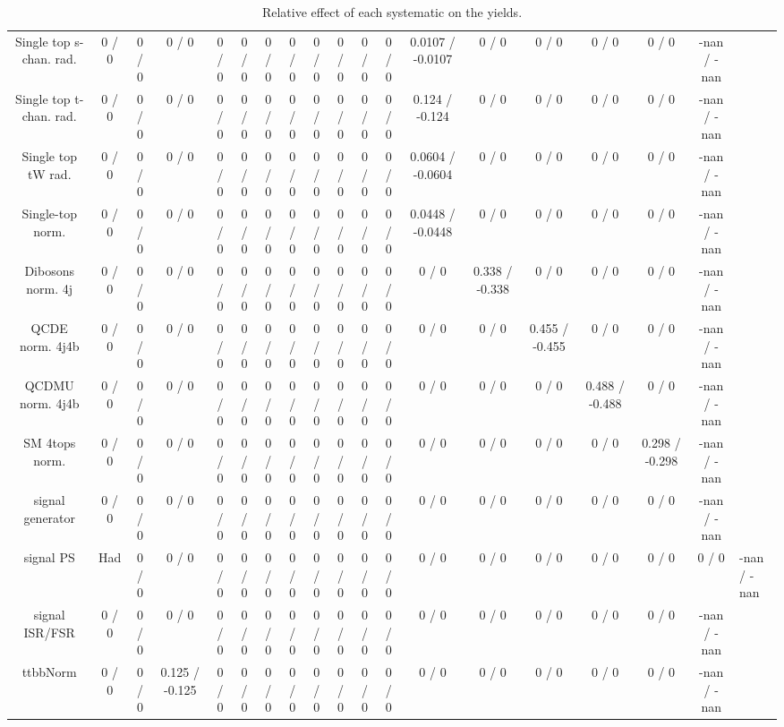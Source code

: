 \documentclass[10pt]{article}
\begin{document}
\begin{table}[htbp]
\begin{center}
\begin{tabular}{|c|c|c|c|c|c|c|c|c|c|c|c|c|c|c|c|c|c|}
  Single top s-chan. rad. & 0 / 0 & 0 / 0 & 0 / 0 & 0 / 0 & 0 / 0 & 0 / 0 & 0 / 0 & 0 / 0 & 0 / 0 & 0 / 0 & 0 / 0 & 0.0107 / -0.0107 & 0 / 0 & 0 / 0 & 0 / 0 & 0 / 0 & -nan / -nan \\ 
  Single top t-chan. rad. & 0 / 0 & 0 / 0 & 0 / 0 & 0 / 0 & 0 / 0 & 0 / 0 & 0 / 0 & 0 / 0 & 0 / 0 & 0 / 0 & 0 / 0 & 0.124 / -0.124 & 0 / 0 & 0 / 0 & 0 / 0 & 0 / 0 & -nan / -nan \\ 
  Single top tW rad. & 0 / 0 & 0 / 0 & 0 / 0 & 0 / 0 & 0 / 0 & 0 / 0 & 0 / 0 & 0 / 0 & 0 / 0 & 0 / 0 & 0 / 0 & 0.0604 / -0.0604 & 0 / 0 & 0 / 0 & 0 / 0 & 0 / 0 & -nan / -nan \\ 
  Single-top norm. & 0 / 0 & 0 / 0 & 0 / 0 & 0 / 0 & 0 / 0 & 0 / 0 & 0 / 0 & 0 / 0 & 0 / 0 & 0 / 0 & 0 / 0 & 0.0448 / -0.0448 & 0 / 0 & 0 / 0 & 0 / 0 & 0 / 0 & -nan / -nan \\ 
  Dibosons norm. 4j & 0 / 0 & 0 / 0 & 0 / 0 & 0 / 0 & 0 / 0 & 0 / 0 & 0 / 0 & 0 / 0 & 0 / 0 & 0 / 0 & 0 / 0 & 0 / 0 & 0.338 / -0.338 & 0 / 0 & 0 / 0 & 0 / 0 & -nan / -nan \\ 
  QCDE norm. 4j4b & 0 / 0 & 0 / 0 & 0 / 0 & 0 / 0 & 0 / 0 & 0 / 0 & 0 / 0 & 0 / 0 & 0 / 0 & 0 / 0 & 0 / 0 & 0 / 0 & 0 / 0 & 0.455 / -0.455 & 0 / 0 & 0 / 0 & -nan / -nan \\ 
  QCDMU norm. 4j4b & 0 / 0 & 0 / 0 & 0 / 0 & 0 / 0 & 0 / 0 & 0 / 0 & 0 / 0 & 0 / 0 & 0 / 0 & 0 / 0 & 0 / 0 & 0 / 0 & 0 / 0 & 0 / 0 & 0.488 / -0.488 & 0 / 0 & -nan / -nan \\ 
  SM 4tops norm. & 0 / 0 & 0 / 0 & 0 / 0 & 0 / 0 & 0 / 0 & 0 / 0 & 0 / 0 & 0 / 0 & 0 / 0 & 0 / 0 & 0 / 0 & 0 / 0 & 0 / 0 & 0 / 0 & 0 / 0 & 0.298 / -0.298 & -nan / -nan \\ 
  signal generator & 0 / 0 & 0 / 0 & 0 / 0 & 0 / 0 & 0 / 0 & 0 / 0 & 0 / 0 & 0 / 0 & 0 / 0 & 0 / 0 & 0 / 0 & 0 / 0 & 0 / 0 & 0 / 0 & 0 / 0 & 0 / 0 & -nan / -nan \\ 
  signal PS & Had & 0 / 0 & 0 / 0 & 0 / 0 & 0 / 0 & 0 / 0 & 0 / 0 & 0 / 0 & 0 / 0 & 0 / 0 & 0 / 0 & 0 / 0 & 0 / 0 & 0 / 0 & 0 / 0 & 0 / 0 & 0 / 0 & -nan / -nan \\ 
  signal ISR/FSR & 0 / 0 & 0 / 0 & 0 / 0 & 0 / 0 & 0 / 0 & 0 / 0 & 0 / 0 & 0 / 0 & 0 / 0 & 0 / 0 & 0 / 0 & 0 / 0 & 0 / 0 & 0 / 0 & 0 / 0 & 0 / 0 & -nan / -nan \\ 
 ttbbNorm & 0 / 0 & 0 / 0 & 0.125 / -0.125 & 0 / 0 & 0 / 0 & 0 / 0 & 0 / 0 & 0 / 0 & 0 / 0 & 0 / 0 & 0 / 0 & 0 / 0 & 0 / 0 & 0 / 0 & 0 / 0 & 0 / 0 & -nan / -nan \\ 
\hline 
\end{tabular} 
\caption{Relative effect of each systematic on the yields.} 
\end{center} 
\end{table} 
\end{document}
